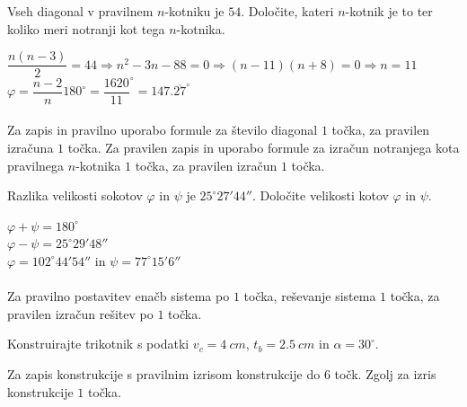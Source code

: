 \documentclass[addpoints]{exam}
\begin{document}
\begin{questions}


    \question[4]
    Vseh diagonal v pravilnem $n$-kotniku je $54$. Določite, kateri $n$-kotnik je to ter koliko meri notranji kot tega $n$-kotnika.

    \begin{solution}[8cm]
        $ \dfrac{n(n-3)}{2}=44 \Rightarrow n^2-3n-88=0 \Rightarrow (n-11)(n+8)=0 \Rightarrow n=11 $ \\
        $ \varphi=\dfrac{n-2}{n}180^\circ=\dfrac{1620}{11}^\circ=147.\overline{27}^\circ $ \\ \\
        Za zapis in pravilno uporabo formule za število diagonal $1$ točka, za pravilen izračuna $1$ točka. 
        Za pravilen zapis in uporabo formule za izračun notranjega kota pravilnega $n$-kotnika $1$ točka, za pravilen izračun $1$ točka.
    \end{solution}



    \question[5]
    Razlika velikosti sokotov $\varphi$ in $\psi$ je $25^\circ 27' 44''$.
    Določite velikosti kotov $\varphi$ in $\psi$.

    \begin{solution}[5cm]
        $\varphi+\psi=180^\circ$ \\
        $\varphi-\psi=25^\circ 29' 48''$ \\
        $\varphi=102^\circ 44' 54''$ in $\psi=77^\circ 15' 6 ''$ \\ \\
        Za pravilno postavitev enačb sistema po $1$ točka, reševanje sistema $1$ točka, za pravilen izračun rešitev po $1$ točka.
    \end{solution}

    

    \newpage

    \question[8]
    Konstruirajte trikotnik s podatki $v_c=4~cm$, $t_b=2.5~cm$ in $\alpha=30^\circ$.

    \begin{solution}[15cm]
        Za zapis konstrukcije s pravilnim izrisom konstrukcije do $6$ točk. Zgolj za izris konstrukcije $1$ točka.
    \end{solution}




    \newpage



\end{questions}
\end{document}
